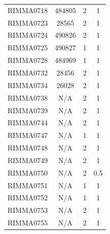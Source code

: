\documentclass[11pt]{article}
\newcounter{rowno}
\begin{document}
\begin{scriptsize}
\begin{longtable}{>{\stepcounter{rowno}}cccc}
    RIMMA0718 & 484805 & 2     & 1 \\
    RIMMA0723 & 28565 & 2     & 1 \\
    RIMMA0724 & 490826 & 2     & 1 \\
    RIMMA0725 & 490827 & 1     & 1 \\
    RIMMA0728 & 484969 & 1     & 1 \\
    RIMMA0732 & 28456 & 2     & 1 \\
    RIMMA0734 & 26028 & 2     & 1 \\
    RIMMA0738 & N/A & 2     & 1 \\
    RIMMA0739 & N/A & 2     & 1 \\
    RIMMA0744 & N/A & 2     & 1 \\
    RIMMA0747 & N/A & 1     & 1 \\
    RIMMA0748 & N/A & 2     & 1 \\
    RIMMA0749 & N/A & 2     & 1 \\
    RIMMA0750 & N/A & 2     & 0.5 \\
    RIMMA0751 & N/A & 1     & 1 \\
    RIMMA0752 & N/A & 1     & 1 \\
    RIMMA0753 & N/A & 2     & 1 \\
    RIMMA0755 & N/A & 2     & 1 \\
    \hline
\end{longtable}
\end{scriptsize}

\clearpage


\clearpage
\end{document}
